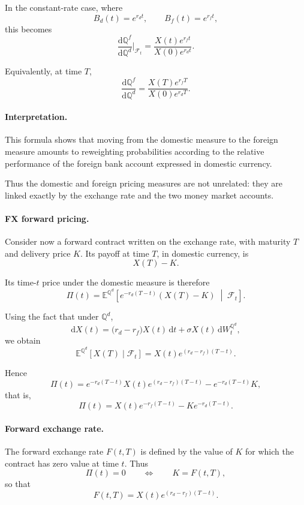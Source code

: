 \documentclass[11pt]{article}
\newcommand{\F}{\mathcal{F}}
\newcommand{\Qbb}{\mathbb{Q}}
\newcommand{\E}{\mathbb{E}}
\theoremstyle{definition}
\theoremstyle{plain}
\begin{document}
In the constant-rate case, where
\[
B_d(t)=e^{r_d t},
\qquad
B_f(t)=e^{r_f t},
\]
this becomes
\[
\frac{\mathrm{d}\Qbb^f}{\mathrm{d}\Qbb^d}\Big|_{\F_t}
=
\frac{X(t)e^{r_f t}}{X(0)e^{r_d t}}.
\]

Equivalently, at time \(T\),
\[
\boxed{
\frac{\mathrm{d}\Qbb^f}{\mathrm{d}\Qbb^d}
=
\frac{X(T)e^{r_f T}}{X(0)e^{r_d T}}.
}
\]

\paragraph{Interpretation.}

This formula shows that moving from the domestic measure to the foreign
measure amounts to reweighting probabilities according to the relative
performance of the foreign bank account expressed in domestic currency.

Thus the domestic and foreign pricing measures are not unrelated:
they are linked exactly by the exchange rate and the two money market
accounts.

\paragraph{FX forward pricing.}

Consider now a forward contract written on the exchange rate, with
maturity \(T\) and delivery price \(K\).
Its payoff at time \(T\), in domestic currency, is
$$
X(T)-K.
$$

Its time-\(t\) price under the domestic measure is therefore
$$
\Pi(t)
=
\E^{\Qbb^d}\!\left[
e^{-r_d(T-t)}(X(T)-K)
\;\middle|\;
\F_t
\right].
$$

Using the fact that under \(\Qbb^d\),
$$
\mathrm{d}X(t)=\big(r_d-r_f\big)X(t)\,\mathrm{d}t+\sigma X(t)\,\mathrm{d}W_t^{\Qbb^d},
$$
we obtain
$$
\E^{\Qbb^d}[X(T)\mid\F_t]
=
X(t)e^{(r_d-r_f)(T-t)}.
$$

Hence
$$
\Pi(t)
=
e^{-r_d(T-t)}X(t)e^{(r_d-r_f)(T-t)}
-
e^{-r_d(T-t)}K,
$$
that is,
$$
\boxed{
\Pi(t)=X(t)e^{-r_f(T-t)}-Ke^{-r_d(T-t)}.
}
$$

\paragraph{Forward exchange rate.}

The forward exchange rate \(F(t,T)\) is defined by the value of \(K\)
for which the contract has zero value at time \(t\).
Thus
$$
\Pi(t)=0
\qquad\Longleftrightarrow\qquad
K=F(t,T),
$$
so that
$$
\boxed{
F(t,T)=X(t)e^{(r_d-r_f)(T-t)}.
}
$$
\end{document}
